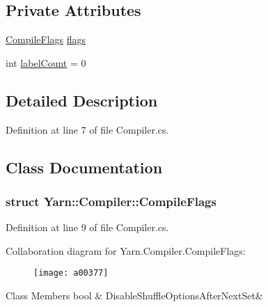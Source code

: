 \subsection*{Private Attributes}
\begin{DoxyCompactItemize}
\item 
\hyperlink{a00048_a00363}{Compile\-Flags} \hyperlink{a00048_a541022d89bcf9bc8f794eb6d6b438d08}{flags}
\item 
int \hyperlink{a00048_a87758397eba2e84cda8e0d6c40656f3f}{label\-Count} = 0
\end{DoxyCompactItemize}


\subsection{Detailed Description}


Definition at line 7 of file Compiler.\-cs.



\subsection{Class Documentation}
\label{a00363}
\hypertarget{a00048_a00363}{}
\subsubsection{struct Yarn\-:\-:Compiler\-:\-:Compile\-Flags}


Definition at line 9 of file Compiler.\-cs.



Collaboration diagram for Yarn.\-Compiler.\-Compile\-Flags\-:
\nopagebreak
\begin{figure}[H]
\begin{center}
\leavevmode
\texttt{[image: a00377]}
\end{center}
\end{figure}
\begin{DoxyFields}{Class Members}
\hypertarget{a00048_a8b49bb7763ff477cba21d7c771ef3ed0}{bool}\label{a00048_a8b49bb7763ff477cba21d7c771ef3ed0}
&
Disable\-Shuffle\-Options\-After\-Next\-Set&
\\
\hline

\end{DoxyFields}


